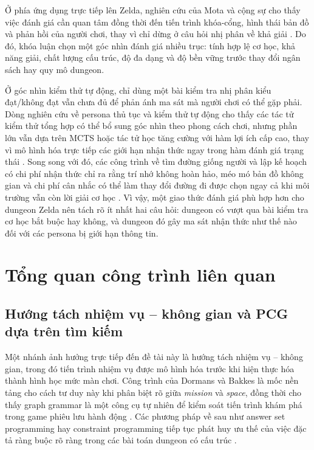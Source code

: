 \documentclass[oneside,a4paper,12pt]{extreport}
\begin{document}
Ở phía ứng dụng trực tiếp lên Zelda, nghiên cứu của Mota và cộng sự cho thấy việc đánh giá cần quan tâm đồng thời đến tiến trình khóa-cổng, hình thái bản đồ và phản hồi của người chơi, thay vì chỉ dừng ở câu hỏi nhị phân về khả giải \cite{mota2021dungeon}. Do đó, khóa luận chọn một góc nhìn đánh giá nhiều trục: tính hợp lệ cơ học, khả năng giải, chất lượng cấu trúc, độ đa dạng và độ bền vững trước thay đổi ngân sách hay quy mô dungeon.

Ở góc nhìn kiểm thử tự động, chỉ dùng một bài kiểm tra nhị phân kiểu đạt/không đạt vẫn chưa đủ để phản ánh ma sát mà người chơi có thể gặp phải. Dòng nghiên cứu về persona thủ tục và kiểm thử tự động cho thấy các tác tử kiểm thử tổng hợp có thể bổ sung góc nhìn theo phong cách chơi, nhưng phần lớn vẫn dựa trên MCTS hoặc tác tử học tăng cường với hàm lợi ích cấp cao, thay vì mô hình hóa trực tiếp các giới hạn nhận thức ngay trong hàm đánh giá trạng thái \cite{holmgard2016personasclones,holmgard2018proceduralpersonas,ariyurek2023beyondpersonas}. Song song với đó, các công trình về tìm đường giống người và lập kế hoạch có chi phí nhận thức chỉ ra rằng trí nhớ không hoàn hảo, méo mó bản đồ không gian và chi phí cân nhắc có thể làm thay đổi đường đi được chọn ngay cả khi môi trường vẫn còn lời giải cơ học \cite{rahmani2022humanlikepath,dubey2022cognitivepath,callaway2022cognitiveresources,lancia2023inforl}. Vì vậy, một giao thức đánh giá phù hợp hơn cho dungeon Zelda nên tách rõ ít nhất hai câu hỏi: dungeon có vượt qua bài kiểm tra cơ học bắt buộc hay không, và dungeon đó gây ma sát nhận thức như thế nào đối với các persona bị giới hạn thông tin.

\section{Tổng quan công trình liên quan}
\subsection{Hướng tách nhiệm vụ -- không gian và PCG dựa trên tìm kiếm}
Một nhánh ảnh hưởng trực tiếp đến đề tài này là hướng tách nhiệm vụ -- không gian, trong đó tiến trình nhiệm vụ được mô hình hóa trước khi hiện thực hóa thành hình học mức màn chơi. Công trình của Dormans và Bakkes là mốc nền tảng cho cách tư duy này khi phân biệt rõ giữa \emph{mission} và \emph{space}, đồng thời cho thấy graph grammar là một công cụ tự nhiên để kiểm soát tiến trình khám phá trong game phiêu lưu hành động \cite{dormans2011missionspaces}. Các phương pháp về sau như answer set programming hay constraint programming tiếp tục phát huy ưu thế của việc đặc tả ràng buộc rõ ràng trong các bài toán dungeon có cấu trúc \cite{smith2018asp,glorian2021dungeoncp}.
\end{document}

